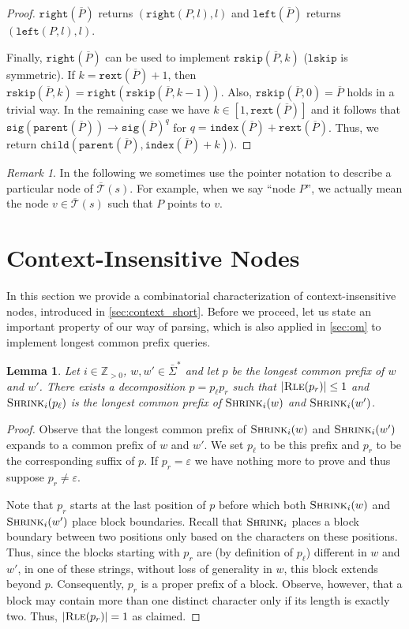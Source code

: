 \documentclass[a4paper]{article}
\newtheorem{lemma}[theorem]{Lemma}
\theoremstyle{remark}
\newtheorem{remark}[theorem]{Remark}
\newcommand{\sigs}{\bar{\Sigma}}
\newcommand{\rle}{\textsc{Rle}}
\newcommand{\shrink}[1]{\ensuremath{\textsc{Shrink}_{#1}}}
\newcommand{\ustree}{\mathcal{\overline{T}}}
\newcommand{\itparent}{\mathtt{parent}}
\newcommand{\itchild}{\mathtt{child}}
\newcommand{\itindex}{\mathtt{index}}
\newcommand{\itleft}{\mathtt{left}}
\newcommand{\itright}{\mathtt{right}}
\newcommand{\itsig}{\mathtt{sig}}
\newcommand{\itrskip}{\mathtt{rskip}}
\newcommand{\itlskip}{\mathtt{lskip}}
\newcommand{\itrext}{\mathtt{rext}}
\newcommand{\eps}{\varepsilon}
\begin{document}
\begin{proof}
$\itright(\overline{P})$ returns $(\itright(P, l), l)$ and $\itleft(\overline{P})$ returns $(\itleft(P, l), l)$.

Finally, $\itright(\overline{P})$ can be used to implement $\itrskip(\overline{P},k)$ ($\itlskip$ is symmetric).
If $k=\itrext(\overline{P})+1$, then $\itrskip(\overline{P},k)=\itright(\itrskip(\overline{P},k-1))$.
Also, $\itrskip(\overline{P},0)=\overline{P}$ holds in a trivial way.
In the remaining case we have $k\in[1,\itrext(\overline{P})]$ and it follows that $\itsig(\itparent(\overline{P}))\to \itsig(\overline{P})^q$
for $q=\itindex(\overline{P})+\itrext(\overline{P})$.
Thus, we return $\itchild(\itparent(\overline{P}),\itindex(\overline{P})+k))$.
\end{proof}

\begin{remark}
In the following we sometimes use the pointer notation
to describe a particular node of $\ustree(s)$.
For example, when we say ``node $P$'', we actually
mean the node $v\in\ustree(s)$ such that $P$ points to $v$.
\end{remark}


\section{Context-Insensitive Nodes}\label{sec:contexti}
In this section we provide a combinatorial characterization of context-insensitive nodes,
introduced in \cref{sec:context_short}.
Before we proceed, let us state an important property of our way of parsing,
which is also applied in \cref{sec:om} to implement longest common prefix queries.

\begin{lemma}\label{lem:lcpd}
Let $i\in \mathbb{Z}_{> 0}$, $w,w'\in \sigs^*$ and let $p$ be the longest common prefix of $w$ and $w'$.
There exists a decomposition $p=p_\ell p_r$ such that $|\rle(p_r)|\le 1$ and $\shrink{i}(p_\ell)$ is the longest common prefix
of $\shrink{i}(w)$ and $\shrink{i}(w')$.
\end{lemma}
\begin{proof}
Observe that the longest common prefix of $\shrink{i}(w)$ and $\shrink{i}(w')$
expands to a common prefix of $w$ and $w'$. We set $p_\ell$ to be this prefix and $p_r$ to be the corresponding
suffix of $p$. If $p_r = \eps$ we have nothing more to prove and thus suppose $p_r\ne \eps$.

Note that $p_r$ starts at the last position of $p$ before which both
$\shrink{i}(w)$ and $\shrink{i}(w')$ place block boundaries.
Recall that $\shrink{i}$ places a block boundary between two positions only based on the characters on these positions.
Thus, since the blocks starting with $p_r$ are (by definition of $p_\ell$) different in $w$ and $w'$,
in one of these strings, without loss of generality in $w$, this block extends beyond $p$.
Consequently, $p_r$ is a proper prefix of a block. Observe, however,
that a block may contain more than one distinct character only if its length is exactly two.
Thus, $|\rle(p_r)|= 1$ as claimed.
\end{proof}
\end{document}
